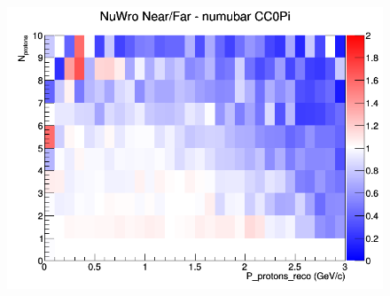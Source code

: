 \begin{figure}[h]
\endminipage
{}
\includegraphics[width=\linewidth]{eff_N_P/LAr/protons/ratios/CC0Pi_NuWro_numubar_NF_N_P.png}
\endminipage
\newline
\end{figure}
\clearpage
